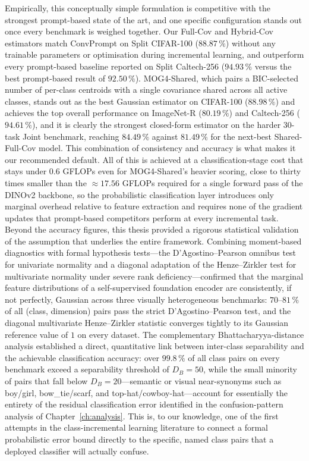 Empirically, this conceptually simple formulation is competitive with the strongest prompt-based state of the art, and one specific configuration stands out once every benchmark is weighed together. Our Full-Cov and Hybrid-Cov estimators match ConvPrompt on Split CIFAR-100 ($88.87\,\%$) without any trainable parameters or optimisation during incremental learning, and outperform every prompt-based baseline reported on Split Caltech-256 ($94.93\,\%$ versus the best prompt-based result of $92.50\,\%$). MOG4-Shared, which pairs a BIC-selected number of per-class centroids with a single covariance shared across all active classes, stands out as the best Gaussian estimator on CIFAR-100 ($88.98\,\%$) and achieves the top overall performance on ImageNet-R ($80.19\,\%$) and Caltech-256 ($94.61\,\%$), and it is clearly the strongest closed-form estimator on the harder 30-task Joint benchmark, reaching $84.49\,\%$ against $81.49\,\%$ for the next-best Shared-Full-Cov model. This combination of consistency and accuracy is what makes it our recommended default. All of this is achieved at a classification-stage cost that stays under $0.6$ GFLOPs even for MOG4-Shared's heavier scoring, close to thirty times smaller than the $\approx 17.56$ GFLOPs required for a single forward pass of the DINOv2 backbone, so the probabilistic classification layer introduces only marginal overhead relative to feature extraction and requires none of the gradient updates that prompt-based competitors perform at every incremental task.
Beyond the accuracy figures, this thesis provided a rigorous statistical validation of the assumption that underlies the entire framework. Combining moment-based diagnostics with formal hypothesis tests---the D'Agostino--Pearson omnibus test for univariate normality and a diagonal adaptation of the Henze--Zirkler test for multivariate normality under severe rank deficiency---confirmed that the marginal feature distributions of a self-supervised foundation encoder are consistently, if not perfectly, Gaussian across three visually heterogeneous benchmarks: $70$--$81\,\%$ of all (class, dimension) pairs pass the strict D'Agostino--Pearson test, and the diagonal multivariate Henze--Zirkler statistic converges tightly to its Gaussian reference value of $1$ on every dataset. The complementary Bhattacharyya-distance analysis established a direct, quantitative link between inter-class separability and the achievable classification accuracy: over $99.8\,\%$ of all class pairs on every benchmark exceed a separability threshold of $D_B=50$, while the small minority of pairs that fall below $D_B=20$---semantic or visual near-synonyms such as boy/girl, bow\_tie/scarf, and top-hat/cowboy-hat---account for essentially the entirety of the residual classification error identified in the confusion-pattern analysis of Chapter~\ref{ch:analysis}. This is, to our knowledge, one of the first attempts in the class-incremental learning literature to connect a formal probabilistic error bound directly to the specific, named class pairs that a deployed classifier will actually confuse.

